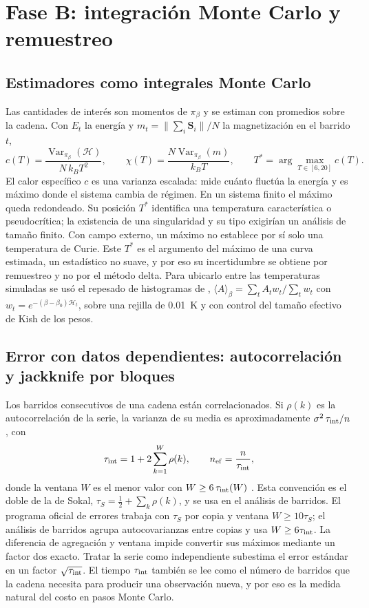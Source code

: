 \section{Fase B: integración Monte Carlo y remuestreo}

\subsection{Estimadores como integrales Monte Carlo}

Las cantidades de interés son momentos de $\pi_\beta$ y se estiman con promedios sobre la cadena. Con $E_t$ la energía y $m_t=\lVert\sum_i\mathbf S_i\rVert/N$ la magnetización en el barrido $t$,
\begin{equation}
c(T)=\frac{\operatorname{Var}_{\pi_\beta}(\mathcal H)}{N\,k_BT^2},\qquad
\chi(T)=\frac{N\operatorname{Var}_{\pi_\beta}(m)}{k_BT},\qquad
T^*=\arg\max_{T\in[6,20]}c(T).
\label{eq:observables}
\end{equation}
El calor específico $c$ es una varianza escalada: mide cuánto fluctúa la energía y es máximo donde el sistema cambia de régimen. En un sistema finito el máximo queda redondeado. Su posición $T^*$ identifica una temperatura característica o pseudocrítica; la existencia de una singularidad y su tipo exigirían un análisis de tamaño finito. Con campo externo, un máximo no establece por sí solo una temperatura de Curie. Este $T^*$ es el argumento del máximo de una curva estimada, un estadístico no suave, y por eso su incertidumbre se obtiene por remuestreo y no por el método delta. Para ubicarlo entre las temperaturas simuladas se usó el repesado de histogramas de \citet{ferrenberg1988}, $\langle A\rangle_\beta=\sum_tA_tw_t/\sum_tw_t$ con $w_t=e^{-(\beta-\beta_0)\mathcal H_t}$, sobre una rejilla de 0.01~K y con control del tamaño efectivo de Kish de los pesos.

\subsection{Error con datos dependientes: autocorrelación y jackknife por bloques}

Los barridos consecutivos de una cadena están correlacionados. Si $\rho(k)$ es la autocorrelación de la serie, la varianza de su media es aproximadamente $\sigma^2\,\tau_{\mathrm{int}}/n$, con
\begin{equation}
\tau_{\mathrm{int}}=1+2\sum_{k=1}^{W}\rho(k),\qquad n_{\mathrm{ef}}=\frac{n}{\tau_{\mathrm{int}}},
\end{equation}
donde la ventana $W$ es el menor valor con $W\ge6\,\tau_{\mathrm{int}}(W)$ \citep{sokal1997,wolff2004}. Esta convención es el doble de la de Sokal, $\tau_S=\tfrac12+\sum_k\rho(k)$, y se usa en el análisis de barridos. El programa oficial de errores trabaja con $\tau_S$ por copia y ventana $W\ge10\tau_S$; el análisis de barridos agrupa autocovarianzas entre copias y usa $W\ge6\tau_{\mathrm{int}}$. La diferencia de agregación y ventana impide convertir sus máximos mediante un factor dos exacto. Tratar la serie como independiente subestima el error estándar en un factor $\sqrt{\tau_{\mathrm{int}}}$. El tiempo $\tau_{\mathrm{int}}$ también se lee como el número de barridos que la cadena necesita para producir una observación nueva, y por eso es la medida natural del costo en pasos Monte Carlo.

